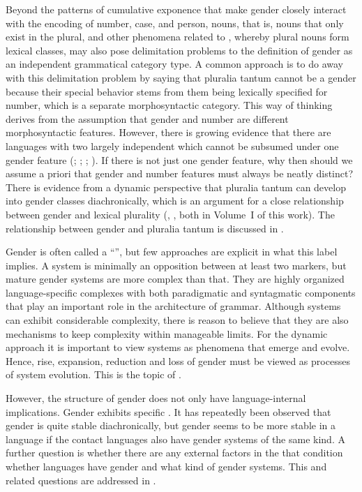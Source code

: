 \documentclass[output=collectionpaper]{langsci/langscibook}
\begin{document}
Beyond the patterns of cumulative exponence that make gender closely interact with the encoding of number, case, and person,  nouns, that is, nouns that only exist in the plural, and other phenomena related to , whereby plural nouns form lexical classes, may also pose delimitation problems to the definition of gender as an independent grammatical category type. A common approach is to do away with this delimitation problem by saying that pluralia tantum cannot be a gender because their special behavior stems from them being lexically specified for number, which is a separate morphosyntactic category. This way of thinking derives from the assumption that gender and number are different morphosyntactic features. However, there is growing evidence that there are languages with two largely independent  which cannot be subsumed under one gender feature (\citealt{Fedden2017}; \citealt{Corbett2017}; ; ). If there is not just one gender feature, why then should we assume a priori that gender and number features must always be neatly distinct? There is evidence from a dynamic perspective that pluralia tantum can develop into gender classes diachronically, which is an argument for a close relationship between gender and lexical plurality (\citealt{Dryerthisyear}, \citealt{Olssonthisyear}, both in Volume~I of this work). The relationship between gender and pluralia tantum is discussed in .

Gender is often called a ``'', but few approaches are explicit in what this label implies. A system is minimally an opposition between at least two markers, but mature gender systems are more complex than that. They are highly organized language-specific complexes with both paradigmatic and syntagmatic components that play an important role in the architecture of grammar. Although systems can exhibit considerable complexity, there is reason to believe that they are also mechanisms to keep complexity within manageable limits. For the dynamic approach it is important to view systems as phenomena that emerge and evolve. Hence, rise, expansion, reduction and loss of gender must be viewed as processes of system evolution. This is the topic of .

However, the structure of gender does not only have language-internal implications. Gender exhibits specific . It has repeatedly been observed that gender is quite stable diachronically, but gender seems to be more stable in a language if the contact languages also have gender systems of the same kind. A further question is whether there are any external factors in the  that condition whether languages have gender and what kind of gender systems. This and related questions are addressed in .
\end{document}
